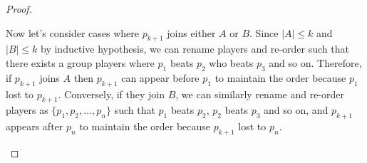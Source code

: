 \documentclass[11pt]{exam}
\begin{document}
\begin{parts}
\begin{customsolutionbox}
\begin{proof}
\begin{itemize}
                Now let's consider cases where $p_{k+1}$ joins either $A$ or $B$. Since $|A| \leq k$ and $|B| \leq k$ by inductive hypothesis, we can rename players and re-order such that there exists a group players where $p_{1}$ beats $p_{2}$ who beats $p_{3}$ and so on. Therefore, if $p_{k+1}$ joins $A$ then $p_{k+1}$ can appear before $p_1$ to maintain the order because $p_1$ lost to $p_{k+1}$. Conversely, if they join $B$, we can similarly rename and re-order players as $\{p_1, p_2, \ldots, p_n\}$ such that $p_1$ beats $p_2$, $p_2$ beats $p_3$ and so on, and $p_{k+1}$ appears after $p_n$ to maintain the order because $p_{k+1}$ lost to $p_n$. \\
            \end{itemize}
        \end{proof}
    \end{customsolutionbox}
\end{parts}
\end{document}
